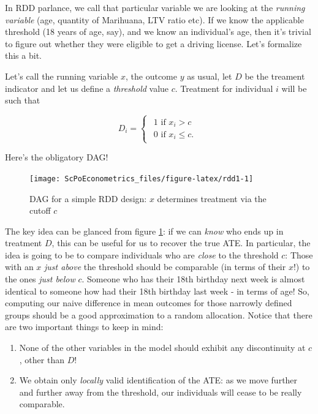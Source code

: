 \documentclass[]{book}
\providecommand{\tightlist}{%
  \setlength{\itemsep}{0pt}\setlength{\parskip}{0pt}}
\begin{document}
In RDD parlance, we call that particular variable we are looking at the \emph{running variable} (age, quantity of Marihuana, LTV ratio etc). If we know the applicable threshold (18 years of age, say), and we know an individual's age, then it's trivial to figure out whether they were eligible to get a driving license. Let's formalize this a bit.

Let's call the running variable \(x\), the outcome \(y\) as usual, let \(D\) be the treament indicator and let us define a \emph{threshold} value \(c\). Treatment for individual \(i\) will be such that

\begin{equation*}
D_i = \begin{cases}\begin{array}{c}1\text{ if }x_i > c \\
                  0\text{ if }x_i \leq c. \end{array}
                  \end{cases}
\end{equation*}

Here's the obligatory DAG!

\begin{figure}

{\centering \texttt{[image: ScPoEconometrics\_files/figure-latex/rdd1-1]} 

}

\caption{DAG for a simple RDD design: $x$ determines treatment via the cutoff $c$}\label{fig:rdd1}
\end{figure}

The key idea can be glanced from figure \ref{fig:rdd1}: if we can \emph{know} who ends up in treatment \(D\), this can be useful for us to recover the true ATE. In particular, the idea is going to be to compare individuals who are \emph{close} to the threshold \(c\): Those with an \(x\) \emph{just above} the threshold should be comparable (in terms of their \(x\)!) to the ones \emph{just below} \(c\). Someone who has their 18th birthday next week is almost identical to someone how had their 18th birthday last week - in terms of age! So, computing our naive difference in mean outcomes for those narrowly defined groups should be a good approximation to a random allocation. Notice that there are two important things to keep in mind:

\begin{enumerate}
\def\labelenumi{\arabic{enumi}.}
\tightlist
\item
  None of the other variables in the model should exhibit any discontinuity at \(c\), other than \(D\)!
\item
  We obtain only \emph{locally} valid identification of the ATE: as we move further and further away from the threshold, our individuals will cease to be really comparable.
\end{enumerate}
\end{document}
